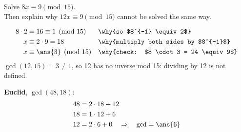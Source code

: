 
Solve $8x \equiv 9 \pmod{15}$.\\
Then explain why $12x \equiv 9 \pmod{15}$ cannot be solved the same way.

\vspace{-6pt}
\begin{align*}
8 \cdot 2 &= 16 \equiv 1 \pmod{15} && \why{so $8^{-1} \equiv 2$}\\
x &\equiv 2 \cdot 9 = 18 && \why{multiply both sides by $8^{-1}$}\\
x &\equiv \ans{3} \pmod{15} && \why{check: $8 \cdot 3 = 24 \equiv 9$}
\end{align*}
$\gcd(12, 15) = 3 \neq 1$, so 12 has no inverse mod 15: dividing by 12 is not defined.

\textbf{Euclid}, $\gcd(48, 18)$:
\begin{align*}
48 &= 2 \cdot 18 + 12\\
18 &= 1 \cdot 12 + 6\\
12 &= 2 \cdot 6 + 0 \quad\Rightarrow\quad \gcd = \ans{6}
\end{align*}
